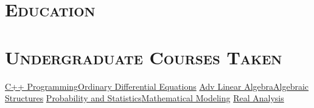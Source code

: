 \documentclass[11pt,a4paper]{moderncv}
\begin{document}
\section{\textsc{Education}}



\section{\textsc{Undergraduate Courses Taken}}
		\cvlistdoubleitem
		{\href{http://pine.humboldt.edu/registrar/catalog/documents/sections/Courses/math.pdf}{C++ Programming}}{\href{http://pine.humboldt.edu/registrar/catalog/documents/sections/Courses/math.pdf}{Ordinary Differential Equations}}	
		\cvlistdoubleitem
		{\href{http://pine.humboldt.edu/registrar/catalog/documents/sections/Courses/math.pdf}{Adv Linear Algebra}}{\href{http://pine.humboldt.edu/registrar/catalog/documents/sections/Courses/math.pdf}{Algebraic Structures}}	
		\cvlistdoubleitem
		{\href{http://pine.humboldt.edu/registrar/catalog/documents/sections/Courses/math.pdf}{Probability and Statistics}}{\href{http://pine.humboldt.edu/registrar/catalog/documents/sections/Courses/math.pdf}{Mathematical Modeling}}	
		\cvlistdoubleitem
		{\href{http://pine.humboldt.edu/registrar/catalog/documents/sections/Courses/math.pdf}{Real Analysis}}{}	
\end{document}
